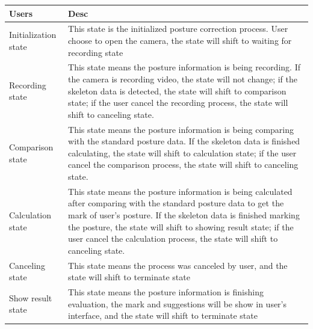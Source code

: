 \documentclass[16pt]{scrreprt}
\begin{document}
\begin{center}
    \begin{tabular}{p{5cm}p{12cm}}
        \hline
	    Users & Desc\\
        \hline
	    Initialization state &  This state is the initialized posture correction process. User choose to open the camera, the state will shift to waiting for recording state \\
        \hline
        Recording state & This state means the posture information is being recording. If the camera is recording video, the state will not change; if the skeleton data is detected, the state will shift to comparison state; if the user cancel the recording process, the state will shift to canceling state.\\
        \hline
        Comparison state & This state means the posture information is being comparing with the standard posture data. If the skeleton data is finished calculating, the state will shift to calculation state; if the user cancel the comparison process, the state will shift to canceling state.\\
        \hline
        Calculation state & This state means the posture information is being calculated after comparing with the standard posture data to get the mark of user's posture. If the skeleton data is finished marking the posture, the state will shift to showing result state; if the user cancel the calculation process, the state will shift to canceling state.\\
        \hline
        Canceling state & This state means the process was canceled by user, and the state will shift to terminate state\\
        \hline
        Show result state & This state means the posture information is finishing evaluation, the mark and suggestions will be show in user's interface, and the state will shift to terminate state\\
        \hline
    \end{tabular}
\end{center}




\end{document}
